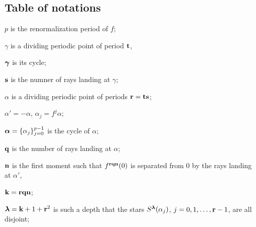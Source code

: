 

\subsection{Table of notations}

$p$ is the renormalization period of $f$;

$\gamma$ is a dividing periodic point of period ${\mathbf{t}}$, 

${\mbox{\boldmath$\gamma$} }$ is its cycle;

${\mathbf{s}}$ is the numner of rays landing at $\gamma$;   

$\alpha$ is a dividing periodic point of periods ${\mathbf{r}}={\mathbf{t}}{\mathbf{s}}$;

$\alpha'=-\alpha$, $\alpha_j=f^j\alpha$;

${\mbox{\boldmath$\alpha$} }=\{\alpha_j\}_{j=0}^{p-1}$ is the cycle of $\alpha$; 

${\mathbf{q}}$ is the number of rays landing at $\alpha$;

${\mathbf{n}}$ is the first moment such that $f^{{\mathbf{r}}{\mathbf{q}}{\mathbf{n}}}(0)$ is separated from $0$ by the rays 
      landing at $\alpha'$,

 ${\mathbf{k}}= {\mathbf{r}}{\mathbf{q}}{\mathbf{n}}$;

${\boldsymbol{\lambda}}= {\mathbf{k}}+1+{\mathbf{r}}^2$ is such a depth that the stars $S^{\boldsymbol{\lambda}}(\alpha_j)$, $j=0,1,\dots, {\mathbf{r}}-1$,
       are all disjoint; 



